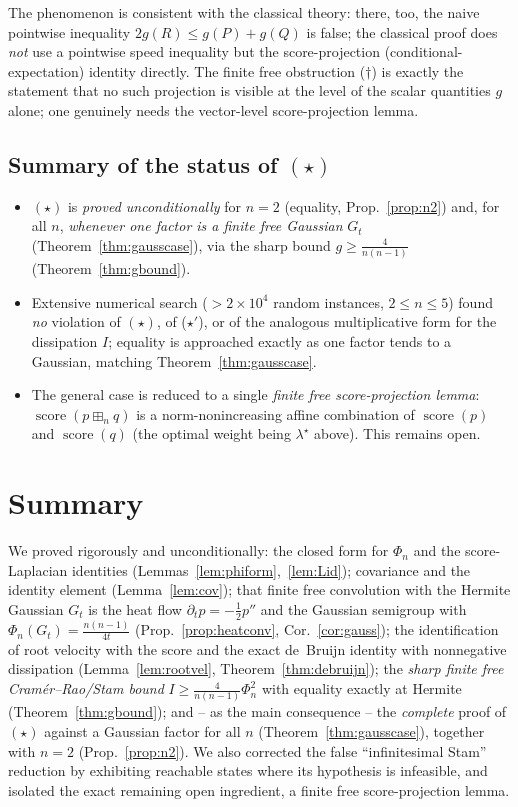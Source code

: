 \documentclass[12pt]{article}
\theoremstyle{remark}
\DeclareMathOperator{\score}{score}
\newcommand{\boxp}{\boxplus_n}
\begin{document}
The phenomenon is consistent with the classical theory: there, too, the naive
pointwise inequality $2g(R)\le g(P)+g(Q)$ is false; the classical proof does
\emph{not} use a pointwise speed inequality but the score-projection
(conditional-expectation) identity directly.  The finite free obstruction
($\dagger$) is exactly the statement that no such projection is visible at the
level of the scalar quantities $g$ alone; one genuinely needs the vector-level
score-projection lemma.

\subsection*{Summary of the status of $(\star)$}
\begin{itemize}
\item $(\star)$ is \emph{proved unconditionally} for $n=2$ (equality,
Prop.~\ref{prop:n2}) and, for all $n$, \emph{whenever one factor is a finite
free Gaussian} $G_t$ (Theorem~\ref{thm:gausscase}), via the sharp bound
$g\ge\frac4{n(n-1)}$ (Theorem~\ref{thm:gbound}).
\item Extensive numerical search ($>2\times10^4$ random instances, $2\le n\le5$)
found \emph{no} violation of $(\star)$, of ($\star'$), or of the analogous
multiplicative form for the dissipation $I$; equality is approached exactly as
one factor tends to a Gaussian, matching Theorem~\ref{thm:gausscase}.
\item The general case is reduced to a single \emph{finite free
score-projection lemma}: $\score(p\boxp q)$ is a norm-nonincreasing affine
combination of $\score(p)$ and $\score(q)$ (the optimal weight being
$\lambda^\star$ above).  This remains open.
\end{itemize}

\section{Summary}

We proved rigorously and unconditionally: the closed form for $\Phi_n$ and the
score-Laplacian identities (Lemmas~\ref{lem:phiform},~\ref{lem:Lid});
covariance and the identity element (Lemma~\ref{lem:cov}); that finite free
convolution with the Hermite Gaussian $G_t$ is the heat flow
$\partial_tp=-\tfrac12 p''$ and the Gaussian semigroup with
$\Phi_n(G_t)=\frac{n(n-1)}{4t}$ (Prop.~\ref{prop:heatconv},
Cor.~\ref{cor:gauss}); the identification of root velocity with the score and
the exact de~Bruijn identity with nonnegative dissipation
(Lemma~\ref{lem:rootvel}, Theorem~\ref{thm:debruijn}); the \emph{sharp finite
free Cram\'er--Rao/Stam bound} $I\ge\frac{4}{n(n-1)}\Phi_n^2$ with equality
exactly at Hermite (Theorem~\ref{thm:gbound}); and -- as the main consequence
-- the \emph{complete} proof of $(\star)$ against a Gaussian factor for all $n$
(Theorem~\ref{thm:gausscase}), together with $n=2$ (Prop.~\ref{prop:n2}).  We
also corrected the false ``infinitesimal Stam'' reduction by exhibiting
reachable states where its hypothesis is infeasible, and isolated the exact
remaining open ingredient, a finite free score-projection lemma.
\end{document}
